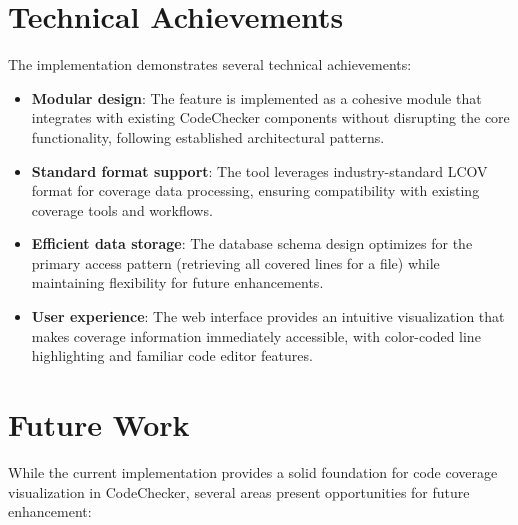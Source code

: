 \section{Technical Achievements}

The implementation demonstrates several technical achievements:

\begin{itemize}
    \item \textbf{Modular design}: The feature is implemented as a cohesive module that integrates with existing CodeChecker components without disrupting the core functionality, following established architectural patterns.
    \item \textbf{Standard format support}: The tool leverages industry-standard LCOV format for coverage data processing, ensuring compatibility with existing coverage tools and workflows.
    \item \textbf{Efficient data storage}: The database schema design optimizes for the primary access pattern (retrieving all covered lines for a file) while maintaining flexibility for future enhancements.
    \item \textbf{User experience}: The web interface provides an intuitive visualization that makes coverage information immediately accessible, with color-coded line highlighting and familiar code editor features.
\end{itemize}

\section{Future Work}

While the current implementation provides a solid foundation for code coverage visualization in CodeChecker, several areas present opportunities for future enhancement:

